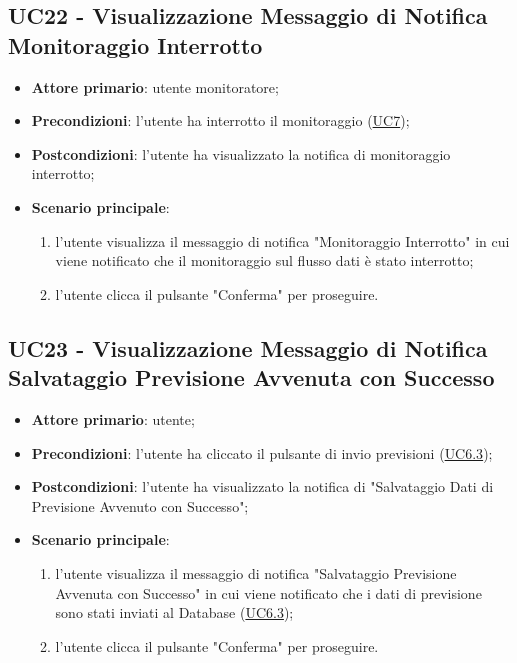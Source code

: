 
	\label{par:UC22}
	\subsection{UC22 - Visualizzazione Messaggio di Notifica Monitoraggio Interrotto}
		\begin{itemize}
			\item\textbf{Attore primario}: utente monitoratore;
			\item\textbf{Precondizioni}: l’utente ha interrotto il monitoraggio (\hyperref[par:UC7]{UC7});
			\item\textbf{Postcondizioni}: l’utente ha visualizzato la notifica di monitoraggio interrotto;
			\item\textbf{Scenario principale}:
				\begin{enumerate}
					\item l’utente visualizza il messaggio di notifica "Monitoraggio Interrotto" in cui viene notificato che il monitoraggio sul flusso dati è stato interrotto;
					\item l'utente clicca il pulsante "Conferma" per proseguire.		
				\end{enumerate}		
		\end{itemize}


		
	\label{par:UC23}
	\subsection{UC23 - Visualizzazione Messaggio di Notifica Salvataggio Previsione Avvenuta con Successo}	\begin{itemize}
			\item\textbf{Attore primario}: utente;
			\item\textbf{Precondizioni}: l'utente ha cliccato il pulsante di invio previsioni (\hyperref[par:UC6.3]{UC6.3});
			\item\textbf{Postcondizioni}: l'utente ha visualizzato la notifica di "Salvataggio Dati di Previsione Avvenuto con Successo";
			\item\textbf{Scenario principale}:
				\begin{enumerate}
					\item l’utente visualizza il messaggio di notifica "Salvataggio Previsione Avvenuta con Successo" in cui viene notificato che i dati di previsione sono stati inviati al Database (\hyperref[par:UC6.3]{UC6.3});
					\item l'utente clicca il pulsante "Conferma" per proseguire.		
				\end{enumerate}		
		\end{itemize}

